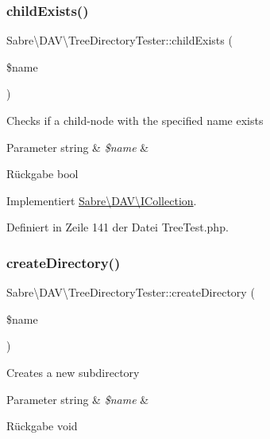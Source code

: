 \subsubsection{\texorpdfstring{child\+Exists()}{childExists()}}
{\footnotesize\ttfamily Sabre\textbackslash{}\+D\+A\+V\textbackslash{}\+Tree\+Directory\+Tester\+::child\+Exists (\begin{DoxyParamCaption}\item[{}]{\$name }\end{DoxyParamCaption})}

Checks if a child-\/node with the specified name exists


\begin{DoxyParams}[1]{Parameter}
string & {\em \$name} & \\
\hline
\end{DoxyParams}
\begin{DoxyReturn}{Rückgabe}
bool 
\end{DoxyReturn}


Implementiert \mbox{\hyperlink{interface_sabre_1_1_d_a_v_1_1_i_collection_a81b44dc1354370890279af58c34c7375}{Sabre\textbackslash{}\+D\+A\+V\textbackslash{}\+I\+Collection}}.



Definiert in Zeile 141 der Datei Tree\+Test.\+php.

\mbox{\label{class_sabre_1_1_d_a_v_1_1_tree_directory_tester_ad78897c04381c71772aab8c6d16adfea}} 
\subsubsection{\texorpdfstring{create\+Directory()}{createDirectory()}}
{\footnotesize\ttfamily Sabre\textbackslash{}\+D\+A\+V\textbackslash{}\+Tree\+Directory\+Tester\+::create\+Directory (\begin{DoxyParamCaption}\item[{}]{\$name }\end{DoxyParamCaption})}

Creates a new subdirectory


\begin{DoxyParams}[1]{Parameter}
string & {\em \$name} & \\
\hline
\end{DoxyParams}
\begin{DoxyReturn}{Rückgabe}
void 
\end{DoxyReturn}


